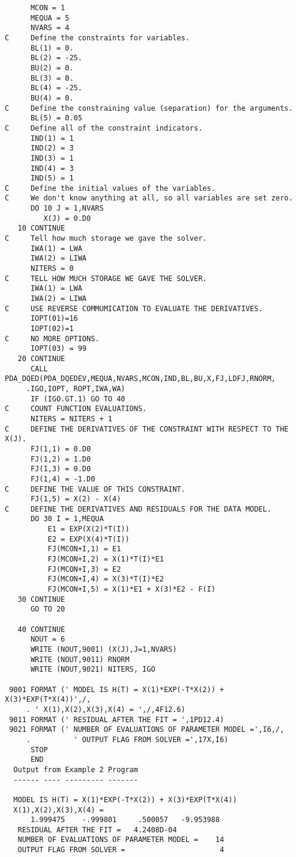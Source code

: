 \begin{verbatim}
      MCON = 1
      MEQUA = 5
      NVARS = 4
C     Define the constraints for variables.
      BL(1) = 0.
      BL(2) = -25.
      BU(2) = 0.
      BL(3) = 0.
      BL(4) = -25.
      BU(4) = 0.
C     Define the constraining value (separation) for the arguments.
      BL(5) = 0.05
C     Define all of the constraint indicators.
      IND(1) = 1
      IND(2) = 3
      IND(3) = 1
      IND(4) = 3
      IND(5) = 1
C     Define the initial values of the variables.
C     We don't know anything at all, so all variables are set zero.
      DO 10 J = 1,NVARS
         X(J) = 0.D0
   10 CONTINUE
C     Tell how much storage we gave the solver.
      IWA(1) = LWA
      IWA(2) = LIWA
      NITERS = 0
C     TELL HOW MUCH STORAGE WE GAVE THE SOLVER.
      IWA(1) = LWA
      IWA(2) = LIWA
C     USE REVERSE COMMUMICATION TO EVALUATE THE DERIVATIVES.
      IOPT(01)=16
      IOPT(02)=1
C     NO MORE OPTIONS.
      IOPT(03) = 99
   20 CONTINUE
      CALL PDA_DQED(PDA_DQEDEV,MEQUA,NVARS,MCON,IND,BL,BU,X,FJ,LDFJ,RNORM,
     .IGO,IOPT, ROPT,IWA,WA)
      IF (IGO.GT.1) GO TO 40
C     COUNT FUNCTION EVALUATIONS.
      NITERS = NITERS + 1
C     DEFINE THE DERIVATIVES OF THE CONSTRAINT WITH RESPECT TO THE X(J).
      FJ(1,1) = 0.D0
      FJ(1,2) = 1.D0
      FJ(1,3) = 0.D0
      FJ(1,4) = -1.D0
C     DEFINE THE VALUE OF THIS CONSTRAINT.
      FJ(1,5) = X(2) - X(4)
C     DEFINE THE DERIVATIVES AND RESIDUALS FOR THE DATA MODEL.
      DO 30 I = 1,MEQUA
          E1 = EXP(X(2)*T(I))
          E2 = EXP(X(4)*T(I))
          FJ(MCON+I,1) = E1
          FJ(MCON+I,2) = X(1)*T(I)*E1
          FJ(MCON+I,3) = E2
          FJ(MCON+I,4) = X(3)*T(I)*E2
          FJ(MCON+I,5) = X(1)*E1 + X(3)*E2 - F(I)
   30 CONTINUE
      GO TO 20

   40 CONTINUE
      NOUT = 6
      WRITE (NOUT,9001) (X(J),J=1,NVARS)
      WRITE (NOUT,9011) RNORM
      WRITE (NOUT,9021) NITERS, IGO

 9001 FORMAT (' MODEL IS H(T) = X(1)*EXP(-T*X(2)) + X(3)*EXP(T*X(4))',/,
     . ' X(1),X(2),X(3),X(4) = ',/,4F12.6)
 9011 FORMAT (' RESIDUAL AFTER THE FIT = ',1PD12.4)
 9021 FORMAT (' NUMBER OF EVALUATIONS OF PARAMETER MODEL =',I6,/,
     .          ' OUTPUT FLAG FROM SOLVER =',17X,I6)
      STOP
      END
  Output from Example 2 Program
  ------ ---- --------- -------

  MODEL IS H(T) = X(1)*EXP(-T*X(2)) + X(3)*EXP(T*X(4))
  X(1),X(2),X(3),X(4) =
      1.999475    -.999801     .500057   -9.953988
   RESIDUAL AFTER THE FIT =   4.2408D-04
   NUMBER OF EVALUATIONS OF PARAMETER MODEL =    14
   OUTPUT FLAG FROM SOLVER =                      4


\end{verbatim}
